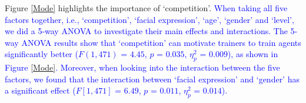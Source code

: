 Figure \ref{Mode} highlights the importance of `competition'. %
\textcolor{blue}{When taking all five factors together, i.e., `competition', `facial expression', `age', `gender' and `level', we did a 5-way ANOVA to investigate their main effects and interactions. %
The 5-way ANOVA results show that `competition' can motivate trainers to train agents significantly better ($F(1,471)$ = $4.45$, $p$ = $0.035$, $\eta_{p}^{2}$ = $0.009$), as shown in Figure \ref{Mode}. %
Moreover, when looking into the interaction between the five factors, we found that the interaction between `facial expression' and `gender' has a significant %
effect %
($F[1,471]$ = $6.49$, $p$ = $0.011$, $\eta_{p}^{2}$ = $0.014$). }%

